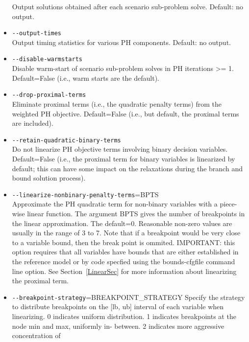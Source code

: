 \begin{itemize}
                        Output solutions obtained after each scenario sub-problem solve. Default: no output.
  \item \verb|--output-times|\\        Output timing statistics for various PH components. Default: no output.
  \item \verb|--disable-warmstarts|\\
                  Disable warm-start of scenario sub-problem solves in PH iterations >= 1.
                  Default=False (i.e., warm starts are the default).
  \item \verb|--drop-proximal-terms|\\
                  Eliminate proximal terms (i.e., the quadratic penalty terms) from the weighted PH objective.
                  Default=False (i.e., but default, the proximal terms are included).
  \item \verb|--retain-quadratic-binary-terms|\\
                  Do not linearize PH objective terms involving binary decision variables.
                  Default=False (i.e., the proximal term for binary variables is linearized by default; this can have some impact on the relaxations during the branch and bound solution process).
  \item \verb|--linearize-nonbinary-penalty-terms|=BPTS\\
                  Approximate the PH quadratic term for non-binary variables with a piece-wise linear function. The argument
                  BPTS gives the number of breakpoints in the linear approximation. The default=0. Reasonable non-zero
                  values are usually in the range of 3 to 7. Note that if a breakpoint would be very close to a variable 
                  bound, then the break point is ommited. IMPORTANT: this option requires that all variables have bounds that
                  are either established in the reference model or by code specfied using the bounds-cfgfile command line option. See Section~\ref{LinearSec}
                  for more information about linearizing the proximal term.
  \item \verb|--breakpoint-strategy|=BREAKPOINT\_STRATEGY
                        Specify the strategy to distribute breakpoints on the
                        [lb, ub] interval of each variable when linearizing. 0
                        indicates uniform distribution. 1 indicates
                        breakpoints at the node min and max, uniformly in-
                        between. 2 indicates more aggressive concentration of

\end{itemize}
